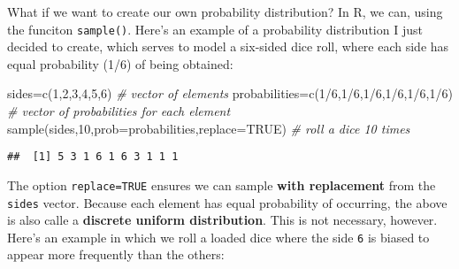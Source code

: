 \documentclass[
]{book}
\newenvironment{Shaded}{\begin{snugshade}}{\end{snugshade}}
\newcommand{\AttributeTok}[1]{\textcolor[rgb]{0.77,0.63,0.00}{#1}}
\newcommand{\CommentTok}[1]{\textcolor[rgb]{0.56,0.35,0.01}{\textit{#1}}}
\newcommand{\ConstantTok}[1]{\textcolor[rgb]{0.00,0.00,0.00}{#1}}
\newcommand{\DecValTok}[1]{\textcolor[rgb]{0.00,0.00,0.81}{#1}}
\newcommand{\FunctionTok}[1]{\textcolor[rgb]{0.00,0.00,0.00}{#1}}
\newcommand{\NormalTok}[1]{#1}
\newcommand{\OtherTok}[1]{\textcolor[rgb]{0.56,0.35,0.01}{#1}}
\newcommand{\SpecialCharTok}[1]{\textcolor[rgb]{0.00,0.00,0.00}{#1}}
\begin{document}
What if we want to create our own probability distribution? In R, we can, using the funciton \texttt{sample()}. Here's an example of a probability distribution I just decided to create, which serves to model a six-sided dice roll, where each side has equal probability (1/6) of being obtained:

\begin{Shaded}
\begin{Highlighting}[]
\NormalTok{sides}\OtherTok{=}\FunctionTok{c}\NormalTok{(}\DecValTok{1}\NormalTok{,}\DecValTok{2}\NormalTok{,}\DecValTok{3}\NormalTok{,}\DecValTok{4}\NormalTok{,}\DecValTok{5}\NormalTok{,}\DecValTok{6}\NormalTok{) }\CommentTok{\# vector of elements}
\NormalTok{probabilities}\OtherTok{=}\FunctionTok{c}\NormalTok{(}\DecValTok{1}\SpecialCharTok{/}\DecValTok{6}\NormalTok{,}\DecValTok{1}\SpecialCharTok{/}\DecValTok{6}\NormalTok{,}\DecValTok{1}\SpecialCharTok{/}\DecValTok{6}\NormalTok{,}\DecValTok{1}\SpecialCharTok{/}\DecValTok{6}\NormalTok{,}\DecValTok{1}\SpecialCharTok{/}\DecValTok{6}\NormalTok{,}\DecValTok{1}\SpecialCharTok{/}\DecValTok{6}\NormalTok{) }\CommentTok{\# vector of probabilities for each element}
\FunctionTok{sample}\NormalTok{(sides,}\DecValTok{10}\NormalTok{,}\AttributeTok{prob=}\NormalTok{probabilities,}\AttributeTok{replace=}\ConstantTok{TRUE}\NormalTok{) }\CommentTok{\# roll a dice 10 times}
\end{Highlighting}
\end{Shaded}

\begin{verbatim}
##  [1] 5 3 1 6 1 6 3 1 1 1
\end{verbatim}

The option \texttt{replace=TRUE} ensures we can sample \textbf{with replacement} from the \texttt{sides} vector. Because each element has equal probability of occurring, the above is also calle a \textbf{discrete uniform distribution}. This is not necessary, however. Here's an example in which we roll a loaded dice where the side \texttt{6} is biased to appear more frequently than the others:
\end{document}

